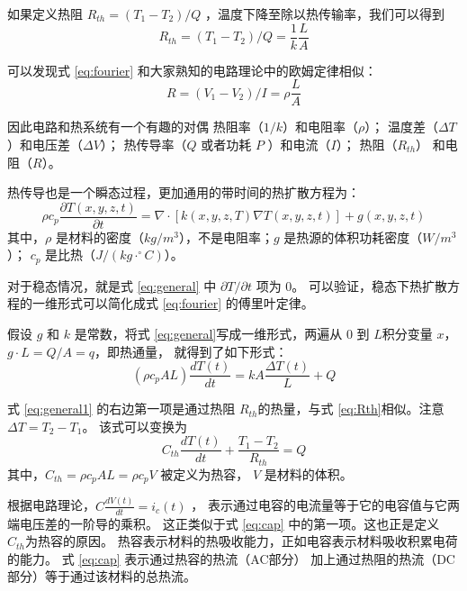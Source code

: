 如果定义热阻 $R_{th} = (T_1 -T_2)/Q$ ，温度下降至除以热传输率，我们可以得到
\begin{equation}\label{eq:Rth}
R_{th} = (T_1-T_2)/Q = \frac{1}{k}\frac{L}{A}
\end{equation}

可以发现式 \eqref{eq:fourier} 和大家熟知的电路理论中的欧姆定律相似：
\begin{equation}\label{eq:Ohm}
R = (V_1-V_2)/I = \rho \frac{L}{A}
\end{equation}

因此电路和热系统有一个有趣的对偶 \raisebox{0.5mm}{------}热阻率（$1/k$）和电阻率（$\rho$）；
温度差（$\Delta T$）和电压差（$\Delta V$）；
热传导率（$Q$ 或者功耗 $P$ ）和电流（$I$）；
热阻（$R_{th}$） 和电阻（$R$）。

热传导也是一个瞬态过程，更加通用的带时间的热扩散方程为：
\begin{equation}\label{eq:general}
 \rho c_p \frac{\partial T(x,y,z,t)}{\partial t} = \nabla \cdot[k(x,y,z,T)\nabla T(x,y,z,t)] +g(x,y,z,t)
\end{equation}
其中，$\rho$ 是材料的密度（$kg/m^3$），不是电阻率；$g$ 是热源的体积功耗密度（$W/m^3$）；
$c_p$ 是比热（$J/(kg \cdot ^\circ C)$）。

对于稳态情况，就是式 \eqref{eq:general} 中 $\partial T/\partial t $ 项为 0。
可以验证，稳态下热扩散方程的一维形式可以简化成式 \eqref{eq:fourier} 的傅里叶定律。

假设 $g$ 和 $k$ 是常数，将式 \eqref{eq:general}写成一维形式，两遍从 $0$ 到 $L$积分变量 $x$，$g\cdot L = Q/A = q$，即热通量， 就得到了如下形式：
\begin{equation}\label{eq:general1}
 (\rho c_p A L) \frac{d T(t)}{d t} = k A \frac{\Delta T(t)}{L} + Q
\end{equation}

式 \eqref{eq:general1} 的右边第一项是通过热阻 $R_{th}$的热量，与式 \eqref{eq:Rth}相似。注意$\Delta T = T_2 - T_1$。
该式可以变换为
\begin{equation}\label{eq:cap}
 C_{th} \frac{d T(t)}{d t} + \frac{ T_1 -T_2}{R_{th}} = Q
\end{equation}
其中，$C_{th} = \rho c_p A L = \rho c_p V $ 被定义为热容， $V$ 是材料的体积。

根据电路理论，$ C  \frac{d V(t)}{d t} = i_c(t)$ ， 表示通过电容的电流量等于它的电容值与它两端电压差的一阶导的乘积。
这正类似于式 \eqref{eq:cap} 中的第一项。这也正是定义 $C_{th}$为热容的原因。
热容表示材料的热吸收能力，正如电容表示材料吸收积累电荷的能力。
式 \eqref{eq:cap} 表示通过热容的热流（AC部分） 加上通过热阻的热流（DC部分）等于通过该材料的总热流。

